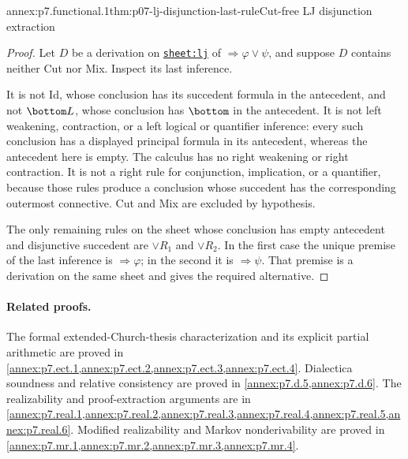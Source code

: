 
\begin{annexitem}{annex:p7.functional.1}{thm:p07-lj-disjunction-last-rule}{Cut-free LJ disjunction extraction}
\begin{proof}
Let \(D\) be a derivation on
\hyperref[sheet:lj]{\texttt{sheet:lj}} of
\(\Rightarrow\varphi\lor\psi\), and suppose \(D\) contains neither
Cut nor Mix.  Inspect its last inference.

It is not Id, whose conclusion has its succedent formula in the antecedent,
and not \(\bottom L\), whose conclusion has \(\bottom\) in the antecedent.
It is not left weakening, contraction, or a left logical or quantifier
inference: every such conclusion has a displayed principal formula in its
antecedent, whereas the antecedent here is empty.  The calculus has no right
weakening or right contraction.  It is not a right rule for conjunction,
implication, or a quantifier, because those rules produce a conclusion whose
succedent has the corresponding outermost connective.  Cut and Mix are
excluded by hypothesis.

The only remaining rules on the sheet whose conclusion has empty antecedent
and disjunctive succedent are \(\lor R_1\) and \(\lor R_2\).  In the first
case the unique premise of the last inference is
\(\Rightarrow\varphi\); in the second it is \(\Rightarrow\psi\).  That premise
is a derivation on the same sheet and gives the required alternative.
\end{proof}
\end{annexitem}

\paragraph{Related proofs.}
The formal extended-Church-thesis characterization and its explicit
partial arithmetic are proved in
\cref{annex:p7.ect.1,annex:p7.ect.2,annex:p7.ect.3,annex:p7.ect.4}.
Dialectica soundness
and relative consistency are proved in \cref{annex:p7.d.5,annex:p7.d.6}.
The realizability and proof-extraction arguments are in
\cref{annex:p7.real.1,annex:p7.real.2,annex:p7.real.3,annex:p7.real.4,annex:p7.real.5,annex:p7.real.6}.
Modified realizability and Markov nonderivability are proved in
\cref{annex:p7.mr.1,annex:p7.mr.2,annex:p7.mr.3,annex:p7.mr.4}.
